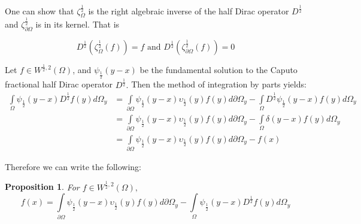 \documentclass{amsart}%
\theoremstyle{plain}
\newtheorem{proposition}{Proposition}
\numberwithin{equation}{section}
\begin{document}
One can show that $\zeta_{\Omega}^{\frac{1}{2}}$ is the right algebraic
inverse of the half Dirac operator $D^{\frac{1}{2}}$ and $\zeta_{\partial
\Omega}^{\frac{1}{2}}$ is in its kernel. That is%

\[
D^{\frac{1}{2}}\left(  \zeta_{\Omega}^{\frac{1}{2}}\left(  f\right)  \right)
=f\text{ \ \ and \ \ }D^{\frac{1}{2}}\left(  \zeta_{\partial\Omega}^{\frac
{1}{2}}\left(  f\right)  \right)  =0
\]


Let $f\in W^{\frac{1}{2},2}\left(  \Omega\right)  $, and $\psi_{\frac{1}{2}%
}\left(  y-x\right)  $ be the fundamental solution to the Caputo fractional
half Dirac operator $D^{\frac{1}{2}}.$ Then the method of integration by parts
yields: \-%
\begin{align*}%
{\displaystyle\int\limits_{\Omega}}
\psi_{\frac{1}{2}}\left(  y-x\right)  D^{\frac{1}{2}}f(y)d\Omega_{y}  & =%
{\displaystyle\int\limits_{\partial\Omega}}
\psi_{\frac{1}{2}}\left(  y-x\right)  \upsilon_{\frac{1}{2}}\left(  y\right)
f(y)d\partial\Omega_{y}-%
{\displaystyle\int\limits_{\Omega}}
D^{\frac{1}{2}}\psi_{\frac{1}{2}}\left(  y-x\right)  f(y)d\Omega_{y}\\
& =%
{\displaystyle\int\limits_{\partial\Omega}}
\psi_{\frac{1}{2}}\left(  y-x\right)  \upsilon_{\frac{1}{2}}\left(  y\right)
f(y)d\partial\Omega_{y}-%
{\displaystyle\int\limits_{\Omega}}
\delta\left(  y-x\right)  f(y)d\Omega_{y}\\
& =%
{\displaystyle\int\limits_{\partial\Omega}}
\psi_{\frac{1}{2}}\left(  y-x\right)  \upsilon_{\frac{1}{2}}\left(  y\right)
f(y)d\partial\Omega_{y}-f(x)
\end{align*}


Therefore we can write the following:

\begin{proposition}
For $f\in W^{\frac{1}{2},2}\left(  \Omega\right)  ,$%
\[
f(x)=%
{\displaystyle\int\limits_{\partial\Omega}}
\psi_{\frac{1}{2}}\left(  y-x\right)  \upsilon_{\frac{1}{2}}\left(  y\right)
f(y)d\partial\Omega_{y}-%
{\displaystyle\int\limits_{\Omega}}
\psi_{\frac{1}{2}}\left(  y-x\right)  D^{\frac{1}{2}}f(y)d\Omega_{y}%
\]

\end{proposition}
\end{document}
